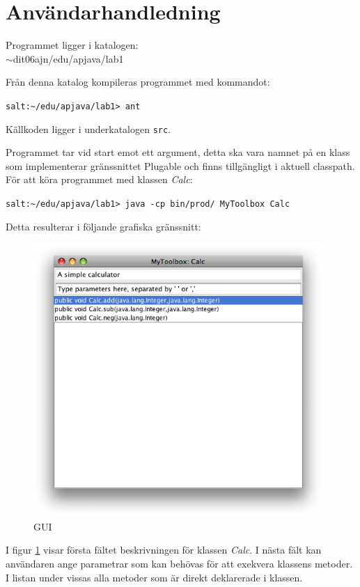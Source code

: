 \documentclass[a4paper, 12pt]{article}
\def\pathToCode{$\sim$dit06ajn/edu/apjava/lab1}
\begin{document}
\section{Användarhandledning}
Programmet ligger i katalogen:\\
\pathToCode

Från denna katalog kompileras programmet med kommandot:

\verb!salt:~/edu/apjava/lab1> ant!

Källkoden ligger i underkatalogen \verb!src!.

Programmet tar vid start emot ett argument, detta ska vara namnet på
en klass som implementerar gränssnittet Plugable %
och finns tillgängligt i aktuell classpath. För att köra programmet
med klassen \textit{Calc}:

\verb!salt:~/edu/apjava/lab1> java -cp bin/prod/ MyToolbox Calc!

Detta resulterar i följande grafiska gränssnitt:

\begin{figure}[H]
  \begin{center}
    \includegraphics[width=110mm]{images/gui-out.png}
    \caption{GUI}
    \label{fig:gui}
  \end{center}
\end{figure}

I figur \ref{fig:gui} visar första fältet beskrivningen för klassen
\textit{Calc}. I nästa fält kan användaren ange parametrar som kan
behövas för att exekvera klassens metoder. I listan under vissas alla
metoder som är direkt deklarerade i klassen.
\end{document}
